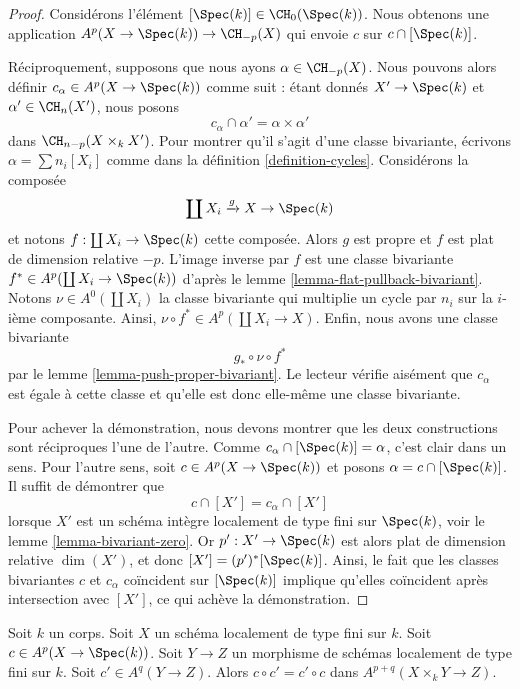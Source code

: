 \begin{proof}
Considérons l'élément $[\Spec(k)] \in \CH_0(\Spec(k))$. Nous obtenons une application
$A^p(X \to \Spec(k)) \to \CH_{-p}(X)$ qui envoie $c$ sur $c \cap [\Spec(k)]$.

\medskip\noindent
Réciproquement, supposons que nous ayons $\alpha \in \CH_{-p}(X)$.
Nous pouvons alors définir $c_\alpha \in A^p(X \to \Spec(k))$ comme
suit : étant donnés $X' \to \Spec(k)$ et $\alpha' \in \CH_n(X')$,
nous posons
$$
c_\alpha \cap \alpha' = \alpha \times \alpha'
$$
dans $\CH_{n - p}(X \times_k X')$. Pour montrer qu'il s'agit d'une classe
bivariante, écrivons $\alpha = \sum n_i[X_i]$ comme dans la
définition \ref{definition-cycles}. Considérons la composée
$$
\coprod X_i \xrightarrow{g} X \to \Spec(k)
$$
et notons $f : \coprod X_i \to \Spec(k)$ cette composée.
Alors $g$ est propre et $f$ est plat de dimension relative $-p$.
L'image inverse par $f$ est une classe bivariante
$f^* \in A^p(\coprod X_i \to \Spec(k))$ d'après le
lemme \ref{lemma-flat-pullback-bivariant}.
Notons $\nu \in A^0(\coprod X_i)$ la classe bivariante
qui multiplie un cycle par $n_i$ sur la $i$-ième composante.
Ainsi, $\nu \circ f^* \in A^p(\coprod X_i \to X)$.
Enfin, nous avons une classe bivariante
$$
g_* \circ \nu \circ f^*
$$
par le lemme \ref{lemma-push-proper-bivariant}. Le lecteur vérifie aisément
que $c_\alpha$ est égale à cette classe et qu'elle est donc
elle-même une classe bivariante.

\medskip\noindent
Pour achever la démonstration, nous devons montrer que les deux constructions
sont réciproques l'une de l'autre. Comme $c_\alpha \cap [\Spec(k)] = \alpha$,
c'est clair dans un sens. Pour l'autre sens, soit
$c \in A^p(X \to \Spec(k))$ et posons $\alpha = c \cap [\Spec(k)]$.
Il suffit de démontrer que
$$
c \cap [X'] = c_\alpha \cap [X']
$$
lorsque $X'$ est un schéma intègre localement de type fini sur $\Spec(k)$,
voir le lemme \ref{lemma-bivariant-zero}. Or $p' : X' \to \Spec(k)$ est alors
plat de dimension relative $\dim(X')$, et donc
$[X'] = (p')^*[\Spec(k)]$. Ainsi, le fait que les classes bivariantes
$c$ et $c_\alpha$ coïncident sur $[\Spec(k)]$ implique qu'elles
coïncident après intersection avec $[X']$, ce qui achève la démonstration.
\end{proof}

\begin{lemma}
\label{lemma-chow-cohomology-towards-point-commutes}
Soit $k$ un corps. Soit $X$ un schéma localement de type fini sur $k$.
Soit $c \in A^p(X \to \Spec(k))$. Soit $Y \to Z$ un morphisme de schémas
localement de type fini sur $k$. Soit $c' \in A^q(Y \to Z)$. Alors
$c \circ c' = c' \circ c$ dans $A^{p + q}(X \times_k Y \to Z)$.
\end{lemma}

